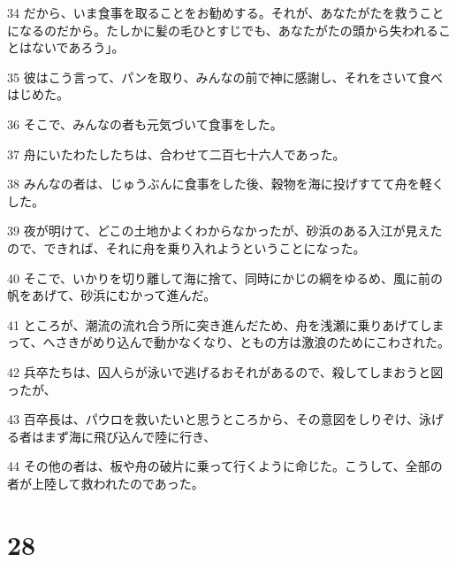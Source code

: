 \par 34 だから、いま食事を取ることをお勧めする。それが、あなたがたを救うことになるのだから。たしかに髪の毛ひとすじでも、あなたがたの頭から失われることはないであろう」。
\par 35 彼はこう言って、パンを取り、みんなの前で神に感謝し、それをさいて食べはじめた。
\par 36 そこで、みんなの者も元気づいて食事をした。
\par 37 舟にいたわたしたちは、合わせて二百七十六人であった。
\par 38 みんなの者は、じゅうぶんに食事をした後、穀物を海に投げすてて舟を軽くした。
\par 39 夜が明けて、どこの土地かよくわからなかったが、砂浜のある入江が見えたので、できれば、それに舟を乗り入れようということになった。
\par 40 そこで、いかりを切り離して海に捨て、同時にかじの綱をゆるめ、風に前の帆をあげて、砂浜にむかって進んだ。
\par 41 ところが、潮流の流れ合う所に突き進んだため、舟を浅瀬に乗りあげてしまって、へさきがめり込んで動かなくなり、ともの方は激浪のためにこわされた。
\par 42 兵卒たちは、囚人らが泳いで逃げるおそれがあるので、殺してしまおうと図ったが、
\par 43 百卒長は、パウロを救いたいと思うところから、その意図をしりぞけ、泳げる者はまず海に飛び込んで陸に行き、
\par 44 その他の者は、板や舟の破片に乗って行くように命じた。こうして、全部の者が上陸して救われたのであった。

\chapter{28}

